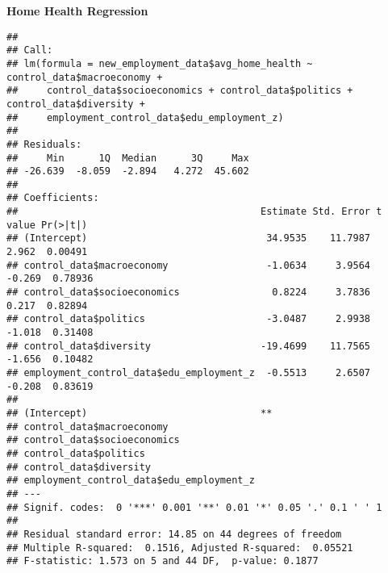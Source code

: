 \documentclass[
]{article}
\newenvironment{Shaded}{\begin{snugshade}}{\end{snugshade}}
\newcommand{\CommentTok}[1]{\textcolor[rgb]{0.56,0.35,0.01}{\textit{#1}}}
\newcommand{\FunctionTok}[1]{\textcolor[rgb]{0.13,0.29,0.53}{\textbf{#1}}}
\newcommand{\NormalTok}[1]{#1}
\newcommand{\OtherTok}[1]{\textcolor[rgb]{0.56,0.35,0.01}{#1}}
\newcommand{\SpecialCharTok}[1]{\textcolor[rgb]{0.81,0.36,0.00}{\textbf{#1}}}
\begin{document}
\textbf{Home Health Regression}

\begin{Shaded}
\end{Shaded}

\begin{verbatim}
## 
## Call:
## lm(formula = new_employment_data$avg_home_health ~ control_data$macroeconomy + 
##     control_data$socioeconomics + control_data$politics + control_data$diversity + 
##     employment_control_data$edu_employment_z)
## 
## Residuals:
##     Min      1Q  Median      3Q     Max 
## -26.639  -8.059  -2.894   4.272  45.602 
## 
## Coefficients:
##                                          Estimate Std. Error t value Pr(>|t|)
## (Intercept)                               34.9535    11.7987   2.962  0.00491
## control_data$macroeconomy                 -1.0634     3.9564  -0.269  0.78936
## control_data$socioeconomics                0.8224     3.7836   0.217  0.82894
## control_data$politics                     -3.0487     2.9938  -1.018  0.31408
## control_data$diversity                   -19.4699    11.7565  -1.656  0.10482
## employment_control_data$edu_employment_z  -0.5513     2.6507  -0.208  0.83619
##                                            
## (Intercept)                              **
## control_data$macroeconomy                  
## control_data$socioeconomics                
## control_data$politics                      
## control_data$diversity                     
## employment_control_data$edu_employment_z   
## ---
## Signif. codes:  0 '***' 0.001 '**' 0.01 '*' 0.05 '.' 0.1 ' ' 1
## 
## Residual standard error: 14.85 on 44 degrees of freedom
## Multiple R-squared:  0.1516, Adjusted R-squared:  0.05521 
## F-statistic: 1.573 on 5 and 44 DF,  p-value: 0.1877
\end{verbatim}
\end{document}
